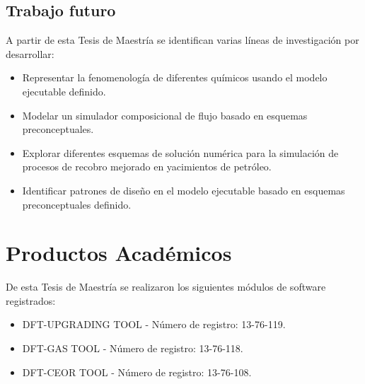 \section{Trabajo futuro}

A partir de esta Tesis de Maestría se identifican varias líneas de investigación por desarrollar:

\begin{itemize}
	\item Representar la fenomenología de diferentes químicos usando el modelo ejecutable definido.
	\item Modelar un simulador composicional de flujo basado en esquemas preconceptuales.
	\item Explorar diferentes esquemas de solución numérica para la simulación de procesos de recobro mejorado en yacimientos de petróleo.
	\item Identificar patrones de diseño en el modelo ejecutable basado en esquemas preconceptuales definido.
\end{itemize}

\chapter*{Productos Académicos}

De esta Tesis de Maestría se realizaron los siguientes módulos de software registrados:

\begin{itemize}
	\item DFT-UPGRADING TOOL - Número de registro: 13-76-119.
	\item DFT-GAS TOOL - Número de registro: 13-76-118.
	\item DFT-CEOR TOOL - Número de registro: 13-76-108.
\end{itemize}

